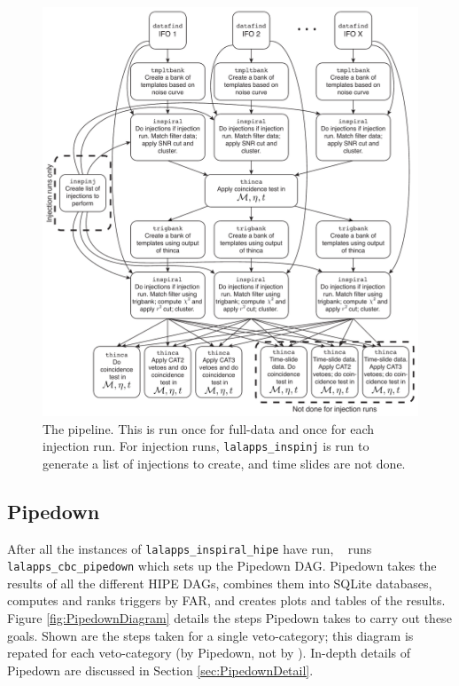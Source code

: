 \begin{figure}[p]
\begin{center}
\includegraphics[width=6in]{figures/HIPEDiagram.pdf}
\end{center}
\caption{
The \hipe pipeline. This is run once for full-data and once for
each injection run. For injection runs, \texttt{lalapps\_inspinj} is run to
generate a list of injections to create, and time slides are not done.
}
\label{fig:HIPEDiagram}
\end{figure}

\subsection{Pipedown}
\label{sec:pipedown_overview}

After all the instances of \texttt{lalapps\_inspiral\_hipe} have run, \ihope~
runs \texttt{lalapps\_cbc\_pipedown} which sets up the Pipedown \ac{DAG}.
Pipedown takes the results of all the different HIPE \acp{DAG}, combines them into
SQLite databases, computes and ranks triggers by \ac{FAR}, and creates plots
and tables of the results. Figure \ref{fig:PipedownDiagram} details the steps
Pipedown takes to carry out these goals. Shown are the steps taken for a single
veto-category; this diagram is repated for each veto-category (by Pipedown, not
by \ihope). In-depth details of Pipedown are discussed in Section
\ref{sec:PipedownDetail}.

